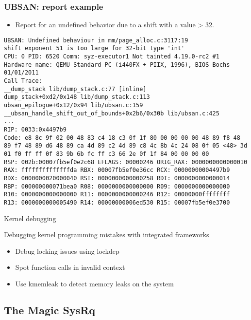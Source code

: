\begin{frame}[fragile]
  \frametitle{UBSAN: report example}
  \begin{itemize}
    \item Report for an undefined behavior due to a shift with a value > 32.
  \end{itemize}
  \begin{block}{}
    \begin{verbatim}
UBSAN: Undefined behaviour in mm/page_alloc.c:3117:19
shift exponent 51 is too large for 32-bit type 'int'
CPU: 0 PID: 6520 Comm: syz-executor1 Not tainted 4.19.0-rc2 #1
Hardware name: QEMU Standard PC (i440FX + PIIX, 1996), BIOS Bochs 01/01/2011
Call Trace:
__dump_stack lib/dump_stack.c:77 [inline]
dump_stack+0xd2/0x148 lib/dump_stack.c:113
ubsan_epilogue+0x12/0x94 lib/ubsan.c:159
__ubsan_handle_shift_out_of_bounds+0x2b6/0x30b lib/ubsan.c:425
...
RIP: 0033:0x4497b9
Code: e8 8c 9f 02 00 48 83 c4 18 c3 0f 1f 80 00 00 00 00 48 89 f8 48
89 f7 48 89 d6 48 89 ca 4d 89 c2 4d 89 c8 4c 8b 4c 24 08 0f 05 <48> 3d
01 f0 ff ff 0f 83 9b 6b fc ff c3 66 2e 0f 1f 84 00 00 00 00
RSP: 002b:00007fb5ef0e2c68 EFLAGS: 00000246 ORIG_RAX: 0000000000000010
RAX: ffffffffffffffda RBX: 00007fb5ef0e36cc RCX: 00000000004497b9
RDX: 0000000020000040 RSI: 0000000000000258 RDI: 0000000000000014
RBP: 000000000071bea0 R08: 0000000000000000 R09: 0000000000000000
R10: 0000000000000000 R11: 0000000000000246 R12: 00000000ffffffff
R13: 0000000000005490 R14: 00000000006ed530 R15: 00007fb5ef0e3700 
    \end{verbatim}
  \end{block}
\end{frame}



\setuplabframe
{Kernel debugging}
{
  Debugging kernel programming mistakes with integrated frameworks
  \begin{itemize}
    \item Debug locking issues using lockdep
    \item Spot function calls in invalid context
    \item Use kmemleak to detect memory leaks on the system
  \end{itemize}
}

\subsection{The Magic SysRq}

